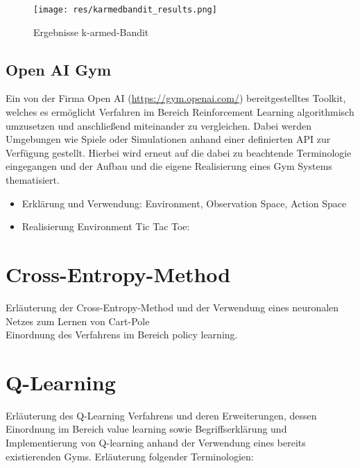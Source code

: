 \documentclass[11pt]{scrartcl}
\begin{document}
\begin{figure}[htp]
\centering
\texttt{[image: res/karmedbandit\_results.png]}
\caption{Ergebnisse k-armed-Bandit}
\label{fig:karmed_bandit}
\end{figure}
\noindent



\newpage
\subsection{Open AI Gym}
Ein von der Firma Open AI (\url{https://gym.openai.com/}) bereitgestelltes Toolkit,
welches es ermöglicht Verfahren im Bereich Reinforcement Learning algorithmisch umzusetzen
und anschließend miteinander zu vergleichen. Dabei werden Umgebungen wie Spiele oder
Simulationen anhand einer definierten API zur Verfügung gestellt. Hierbei wird erneut auf
die dabei zu beachtende Terminologie eingegangen und der Aufbau und die eigene
Realisierung eines Gym Systems thematisiert.

\begin{itemize}
\itemsep0pt
\item Erklärung und Verwendung: Environment, Observation Space, Action Space
\item Realisierung Environment Tic Tac Toe:
\end{itemize}

\section{Cross-Entropy-Method}
Erläuterung der Cross-Entropy-Method und der Verwendung eines neuronalen Netzes zum Lernen
von Cart-Pole
\\
Einordnung des Verfahrens im Bereich policy learning.

\section{Q-Learning}
Erläuterung des Q-Learning Verfahrens und deren Erweiterungen, dessen Einordnung im
Bereich value learning sowie Begriffserklärung und Implementierung von Q-learning anhand
der Verwendung eines bereits existierenden Gyms. Erläuterung folgender Terminologien:

\end{document}
